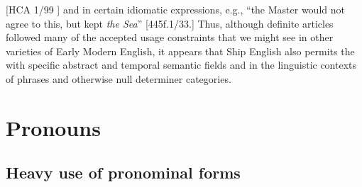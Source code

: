 [HCA 1/99  \citealt{Islands1722}] and in certain idiomatic expressions, e.g., “the Master would not agree to this, but kept \textit{the Sea}” [445f.1/33.] Thus, although definite articles followed many of the accepted usage constraints that we might see in other varieties of Early Modern English, it appears that Ship English also permits the  with specific abstract and temporal semantic fields and in the linguistic contexts of  phrases and otherwise null determiner categories. 

\section{{Pronouns}}%

\subsection{{Heavy use of pronominal forms}}%

